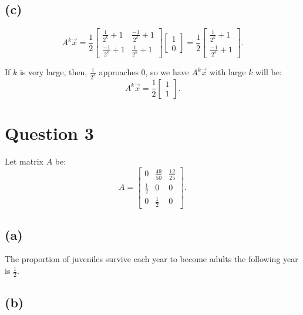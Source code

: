 \documentclass[10pt]{article}
\begin{document}
\subsection*{(c)}

\begin{equation*}
    A^k\Vec{x} = \frac{1}{2}
    \begin{bmatrix}
        \frac{1}{2^k}+1 & \frac{-1}{2^k}+1 \\
        \frac{-1}{2^k}+1 & \frac{1}{2^k}+1
    \end{bmatrix}
    \begin{bmatrix}
        1 \\ 0
    \end{bmatrix} =
    \frac{1}{2}
    \begin{bmatrix}
        \frac{1}{2^k}+1 \\
        \frac{-1}{2^k}+1
    \end{bmatrix}.
\end{equation*}

\noindent If $k$ is very large, then, $\frac{1}{2^k}$ approaches 0, so we have $A^k\Vec{x}$ with large $k$ will be:
\begin{equation*}
    A^k\Vec{x} = \frac{1}{2}
    \begin{bmatrix}
        1 \\
        1
    \end{bmatrix}.
\end{equation*}



\section*{Question 3}
\noindent Let matrix $A$ be:
$$A = 
\begin{bmatrix}
    0 & \frac{49}{50} & \frac{12}{25} \\
    \frac{1}{2} & 0 & 0 \\
    0 & \frac{1}{2} & 0
\end{bmatrix}.$$

\subsection*{(a)}
\noindent The proportion of juveniles survive each year to become adults the following year is $\frac{1}{2}$.


\subsection*{(b)}
\end{document}
